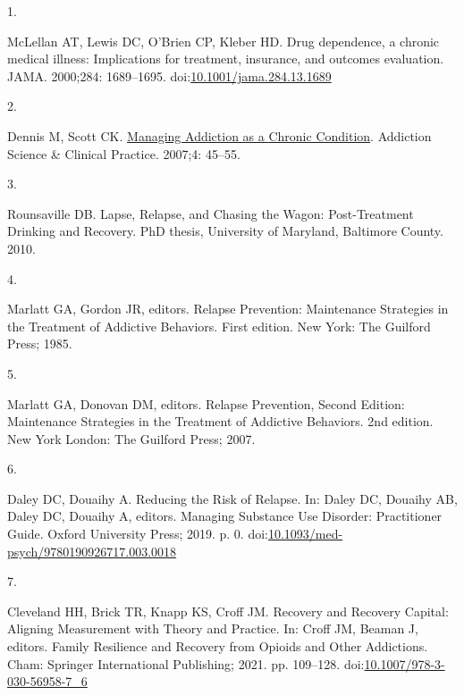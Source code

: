 \documentclass[
  letterpaper,
  DIV=11,
  numbers=noendperiod]{scrartcl}
\newlength{\cslhangindent}
\newlength{\csllabelwidth}
\newenvironment{CSLReferences}[2] %
 {\begin{list}{}{%
  \setlength{\itemindent}{0pt}
  \setlength{\leftmargin}{0pt}
  \setlength{\parsep}{0pt}
  \ifodd #1
   \setlength{\leftmargin}{\cslhangindent}
   \setlength{\itemindent}{-1\cslhangindent}
  \fi
  \setlength{\itemsep}{#2\baselineskip}}}
 {\end{list}}
\newcommand{\CSLLeftMargin}[1]{\parbox[t]{\csllabelwidth}{\strut#1\strut}}
\newcommand{\CSLRightInline}[1]{\parbox[t]{\linewidth - \csllabelwidth}{\strut#1\strut}}
\begin{document}
\protect{}\label{refs}
\begin{CSLReferences}{0}{1}
\CSLLeftMargin{1. }%
\CSLRightInline{McLellan AT, Lewis DC, O'Brien CP, Kleber HD. Drug
dependence, a chronic medical illness: Implications for treatment,
insurance, and outcomes evaluation. JAMA. 2000;284: 1689--1695.
doi:\href{https://doi.org/10.1001/jama.284.13.1689}{10.1001/jama.284.13.1689}}

\CSLLeftMargin{2. }%
\CSLRightInline{Dennis M, Scott CK.
\href{https://www.ncbi.nlm.nih.gov/pmc/articles/PMC2797101}{Managing
{Addiction} as a {Chronic Condition}}. Addiction Science \& Clinical
Practice. 2007;4: 45--55. }

\CSLLeftMargin{3. }%
\CSLRightInline{Rounsaville DB. Lapse, {Relapse}, and {Chasing} the
{Wagon}: {Post-Treatment Drinking} and {Recovery}. PhD thesis,
University of Maryland, Baltimore County. 2010. }

\CSLLeftMargin{4. }%
\CSLRightInline{Marlatt GA, Gordon JR, editors. Relapse {Prevention}:
{Maintenance Strategies} in the {Treatment} of {Addictive Behaviors}.
First edition. New York: The Guilford Press; 1985. }

\CSLLeftMargin{5. }%
\CSLRightInline{Marlatt GA, Donovan DM, editors. Relapse {Prevention},
{Second Edition}: {Maintenance Strategies} in the {Treatment} of
{Addictive Behaviors}. 2nd edition. New York London: The Guilford Press;
2007. }

\CSLLeftMargin{6. }%
\CSLRightInline{Daley DC, Douaihy A. Reducing the {Risk} of {Relapse}.
In: Daley DC, Douaihy AB, Daley DC, Douaihy A, editors. Managing
{Substance Use Disorder}: {Practitioner Guide}. Oxford University Press;
2019. p. 0.
doi:\href{https://doi.org/10.1093/med-psych/9780190926717.003.0018}{10.1093/med-psych/9780190926717.003.0018}}

\CSLLeftMargin{7. }%
\CSLRightInline{Cleveland HH, Brick TR, Knapp KS, Croff JM. Recovery and
{Recovery Capital}: {Aligning Measurement} with {Theory} and {Practice}.
In: Croff JM, Beaman J, editors. Family {Resilience} and {Recovery} from
{Opioids} and {Other Addictions}. Cham: Springer International
Publishing; 2021. pp. 109--128.
doi:\href{https://doi.org/10.1007/978-3-030-56958-7_6}{10.1007/978-3-030-56958-7\_6}}


\end{CSLReferences}
\end{document}
